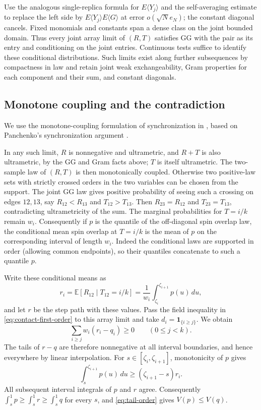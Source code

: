 \documentclass[11pt]{article}
\newcommand{\E}{\mathbb E}
\begin{document}
Use the analogous single-replica formula for $E\langle Y_j\rangle$ and the self-averaging estimate to replace the left side by $E\langle Y_j\rangle E\langle G\rangle$ at error $o(\sqrt N e_N)$; the constant diagonal cancels. Fixed monomials and constants span a dense class on the joint bounded domain. Thus every joint array limit of $(R,T)$ satisfies GG with the pair as its entry and conditioning on the joint entries. Continuous tests suffice to identify these conditional distributions. Such limits exist along further subsequences by compactness in law and retain joint weak exchangeability, Gram properties for each component and their sum, and constant diagonals.

\subsection{Monotone coupling and the contradiction}

We use the monotone-coupling formulation of synchronization in
\cite[Proposition~5.2 and Theorem~5.3]{Mourrat2021Nonconvex}, based on
Panchenko's synchronization argument
\cite[Section~4, Lemma~2]{Panchenko2015Multispecies}.

In any such limit, $R$ is nonnegative and ultrametric, and $R+T$ is also ultrametric, by the GG and Gram facts above; $T$ is itself ultrametric. The two-sample law of $(R,T)$ is then monotonically coupled. Otherwise two positive-law sets with strictly crossed orders in the two variables can be chosen from the support. The joint GG law gives positive probability of seeing such a crossing on edges $12,13$, say $R_{12}<R_{13}$ and $T_{12}>T_{13}$. Then $R_{23}=R_{12}$ and $T_{23}=T_{13}$, contradicting ultrametricity of the sum. The marginal probabilities for $T=i/k$ remain $w_i$. Consequently if $p$ is the quantile of the off-diagonal spin overlap law, the conditional mean spin overlap at $T=i/k$ is the mean of $p$ on the corresponding interval of length $w_i$. Indeed the conditional laws are supported in order (allowing common endpoints), so their quantiles concatenate to such a quantile $p$.

Write these conditional means as
\[
 r_i=\E[R_{12}\mid T_{12}=i/k]
       =\frac1{w_i}\int_{\zeta_i}^{\zeta_{i+1}}p(u)\,du,
\]
and let $r$ be the step path with these values. Pass the field inequality in \eqref{eq:contact-first-order} to this array limit and take $d_i=\mathbf1_{\{i\ge j\}}$. We obtain
\[
 \sum_{i\ge j}w_i(r_i-q_i)\ge0\qquad(0\le j<k).
\]
The tails of $r-q$ are therefore nonnegative at all interval boundaries, and hence everywhere by linear interpolation. For $s\in[\zeta_i,\zeta_{i+1}]$, monotonicity of $p$ gives
\[
 \int_s^{\zeta_{i+1}}p(u)\,du\ge(\zeta_{i+1}-s)r_i.
\]
All subsequent interval integrals of $p$ and $r$ agree. Consequently $\int_s^1p\ge\int_s^1r\ge\int_s^1q$ for every $s$, and \eqref{eq:tail-order} gives $V(p)\le V(q)$.
\end{document}
